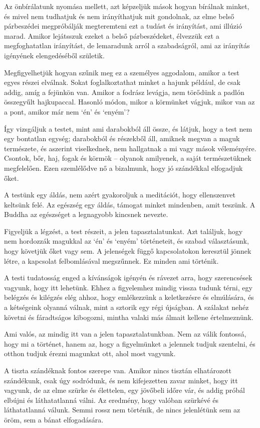 Az önbírálatunk nyomása mellett, azt képzeljük mások hogyan bírálnak
minket, és mivel nem tudhatjuk és nem irányíthatjuk mit gondolnak, az
elme belső párbeszédei megpróbálják megteremteni ezt a tudást és
irányítást, ami illúzió marad. Amikor lejátsszuk ezeket a belső
párbeszédeket, élvezzük ezt a megfoghatatlan irányítást, de lemaradunk
arról a szabadságról, ami az irányítás igényének elengedéséből születik.

Megfigyelhetjük hogyan szűnik meg ez a személyes aggodalom, amikor a
test egyes részei elválnak. Sokat foglalkoztathat minket a hajunk
például, de csak addig, amíg a fejünkön van. Amikor a fodrász levágja,
nem törődünk a padlón összegyűlt hajkupaccal. Hasonló módon, mikor a
körmünket vágjuk, mikor van az a pont, amikor már nem `én' és `enyém'?

Így vizsgáljuk a testet, mint ami darabokból áll össze, és látjuk, hogy
a test nem egy bontatlan egység; darabokból és részekből áll, amiknek
megvan a maguk természete, és aszerint viselkednek, nem hallgatnak a mi
vagy mások véleményére. Csontok, bőr, haj, fogak és körmök -- olyanok
amilyenek, a saját természetüknek megfelelően. Ezen szemlélődve nő a
bizalmunk, hogy jó szándékkal elfogadjuk őket.

A testünk egy áldás, nem azért gyakoroljuk a meditációt, hogy
ellenszenvet keltsünk felé. Az egészség egy áldás, támogat minket
mindenben, amit teszünk. A Buddha az egészséget a legnagyobb kincsnek
nevezte.

Figyeljük a légzést, a test részeit, a jelen tapasztalatunkat. Azt
találjuk, hogy nem hordozzák magukkal az `én' és `enyém' történeteit, és
szabad választásunk, hogy követjük őket vagy sem. A jelenségek függő
kapcsolatokon keresztül jönnek létre, a kapcsolat felbomlásával
megszűnnek. Ez minden ami történik.

A testi tudatosság enged a kívánságok igényén és rávezet arra, hogy
szerencsések vagyunk, hogy itt lehetünk. Ehhez a figyelemhez mindig
vissza tudunk térni, egy belégzés és kilégzés elég ahhoz, hogy
emlékezzünk a keletkezésre és elmúlására, és a kétségeink olyanná
válnak, mint a sztorik egy régi újságban. A szálakat nehéz követni és
fáradtságos kibogozni, mintha valaki más álmait kellene értelmeznünk.

Ami valós, az mindig itt van a jelen tapasztalatunkban. Nem az válik
fontossá, hogy mi a történet, hanem az, hogy a figyelmünket a jelennek
tudjuk szentelni, és otthon tudjuk érezni magunkat ott, ahol most
vagyunk.

A tiszta szándéknak fontos szerepe van. Amikor nincs tisztán
elhatározott szándékunk, csak úgy sodródunk, és nem kifejezetten zavar
minket, hogy itt vagyunk, de az elme szürke és élettelen, egy jövőbeli
időre vár, és addig próbál elbújni és láthatatlanná válni. Az eredmény,
hogy valóban szürkévé és láthatatlanná válunk. Semmi rossz nem történik,
de nincs jelenlétünk sem az öröm, sem a bánat elfogadására.

